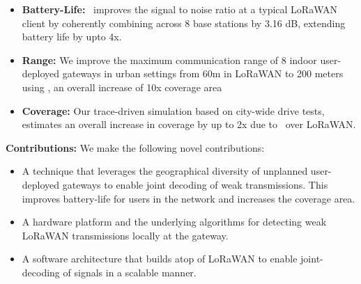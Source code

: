 \begin{itemize}
    \item {\bf Battery-Life: }\name\ improves the signal to noise ratio at a typical LoRaWAN client by coherently combining across 8 base stations by 3.16 dB, extending battery life by upto 4x.
    \item {\bf Range: } We improve the maximum communication range of 8 indoor user-deployed gateways in urban settings from 60m in LoRaWAN to 200 meters using \name, an overall increase of 10x coverage area 
    \item {\bf Coverage: } Our trace-driven simulation based on city-wide drive tests, estimates an overall increase in coverage by up to 2x due to \name\ over LoRaWAN. 
\end{itemize}


\textbf{Contributions:} We make the following novel contributions:
\begin{itemize}
    \item A technique that leverages the geographical diversity of unplanned user-deployed gateways to enable joint decoding of weak transmissions. This improves battery-life for users in the network and increases the coverage area.
    \item A hardware platform and the underlying algorithms for detecting weak LoRaWAN transmissions locally at the gateway. 
    \item A software architecture that builds atop of LoRaWAN to enable joint-decoding of signals in a scalable manner.
\end{itemize}


















